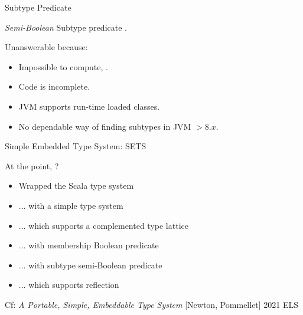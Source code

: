 \begin{frame}{Subtype Predicate}

  \emph{Semi-Boolean} Subtype predicate .

  \usebox\subtypebox

  Unanswerable because:
  \begin{itemize}
  \item Impossible to compute, \eg {}.
  \item Code is incomplete.
  \item JVM supports run-time loaded classes.
  \item No dependable way of finding subtypes in JVM $> 8.x$.
  \end{itemize}

\end{frame}

\begin{frame}{Simple Embedded Type System: SETS}

  At the point, ?

  \begin{itemize}
  \item Wrapped the Scala type system
  \item ... with a simple type system
  \item ... which supports a complemented type lattice
  \item ... with membership Boolean predicate
  \item ... with subtype semi-Boolean predicate
  \item ... which supports reflection
  \end{itemize}

  \medskip

  Cf: \textit{A Portable, Simple, Embeddable Type System} [Newton, Pommellet] 2021 ELS

\end{frame}
